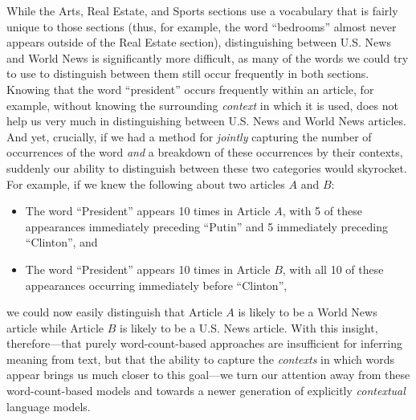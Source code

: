 \documentclass[11pt]{article}
\begin{document}
While the Arts, Real Estate, and Sports sections use a vocabulary that is fairly unique to those sections (thus, for example, the word ``bedrooms'' almost never appears outside of the Real Estate section), distinguishing between U.S. News and World News is significantly more difficult, as many of the words we could try to use to distinguish between them still occur frequently in both sections. Knowing that the word ``president'' occurs frequently within an article, for example, without knowing the surrounding \textit{context} in which it is used, does not help us very much in distinguishing between U.S. News and World News articles. And yet, crucially, if we had a method for \textit{jointly} capturing the number of occurrences of the word \textit{and} a breakdown of these occurrences by their contexts, suddenly our ability to distinguish between these two categories would skyrocket. For example, if we knew the following about two articles $A$ and $B$:
\begin{itemize}
	\item The word ``President'' appears 10 times in Article $A$, with 5 of these appearances immediately preceding ``Putin'' and 5 immediately preceding ``Clinton'', and
	\item The word ``President'' appears 10 times in Article $B$, with all 10 of these appearances occurring immediately before ``Clinton'',
\end{itemize}
we could now easily distinguish that Article $A$ is likely to be a World News article while Article $B$ is likely to be a U.S. News article. With this insight, therefore---that purely word-count-based approaches are insufficient for inferring meaning from text, but that the ability to capture the \textit{contexts} in which words appear brings us much closer to this goal---we turn our attention away from these word-count-based models and towards a newer generation of explicitly \textit{contextual} language models.
\end{document}
